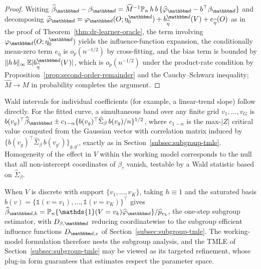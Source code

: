 \documentclass[11pt]{article}
\begin{document}
\begin{proof}
Writing
\(\widehat\beta_{\d}-\beta_{\d}
=\widehat M^{-1}\mathbb{P}_n\,h\,b\,
\{\widehat\varphi_{\d}-b^\top\beta_{\d}\}\)
and decomposing
\(\widehat\varphi_{\d}
=\varphi_{\d}(O;\eta_0^{\d})
+b_{\widehat\eta}^{\d}(V)+e_{\widehat\eta}(O)\)
as in the proof of Theorem~\ref{thm:dr-learner-oracle}, the term involving
\(\varphi_{\d}(O;\eta_0^{\d})\) yields the influence-function expansion, the
conditionally mean-zero term \(e_{\widehat\eta}\) is
\(o_p(n^{-1/2})\) by cross-fitting, and the bias term is bounded by
\(\|h\,b\|_\infty\,\E|b_{\widehat\eta}^{\d}(V)|\), which is
\(o_p(n^{-1/2})\) under the product-rate condition by
Proposition~\ref{prop:second-order-remainder} and the Cauchy--Schwarz
inequality; \(\widehat M\to M\) in probability completes the argument. 
\end{proof}

\begin{remark}
\label{rem:msm-simultaneous}
Wald intervals for individual coefficients (for example, a linear-trend slope)
follow directly. For the fitted curve, a simultaneous band over any finite grid
\(v_1,\ldots,v_G\) is
\(b(v_g)^\top\widehat\beta_{\d}\pm
c_{1-\alpha}\{b(v_g)^\top\widehat\Sigma_\beta\,b(v_g)/n\}^{1/2}\), where
\(c_{1-\alpha}\) is the max-\(|Z|\) critical value computed from the Gaussian
vector with correlation matrix induced by
\(\{b(v_g)^\top\widehat\Sigma_\beta\,b(v_{g'})\}_{g,g'}\), exactly as in
Section~\ref{subsec:subgroup-tmle}. Homogeneity of the effect in \(V\) within
the working model corresponds to the null that all non-intercept coordinates of
\(\beta_\tau\) vanish, testable by a Wald statistic based on
\(\widehat\Sigma_\beta\).
\end{remark}

\begin{remark}
\label{rem:msm-saturated}
When \(V\) is discrete with support \(\{v_1,\ldots,v_K\}\), taking
\(h\equiv 1\) and the saturated basis
\(b(v)=\{\mathds{1}(v=v_1),\ldots,\mathds{1}(v=v_K)\}^\top\) gives
\(\widehat\beta_{\d,k}
=\mathbb{P}_n\{\mathds{1}(V=v_k)\widehat\varphi_{\d}\}/\widehat p_{v_k}\), the
one-step subgroup estimator, with \(D_{\beta,\d}\) reducing coordinatewise to
the subgroup efficient influence functions
\(D_{\d,v}\) of Section~\ref{subsec:subgroup-tmle}. The working-model
formulation therefore nests the subgroup analysis, and the TMLE of
Section~\ref{subsec:subgroup-tmle} may be viewed as its targeted refinement,
whose plug-in form guarantees that estimates respect the parameter space.
\end{remark}
\end{document}

